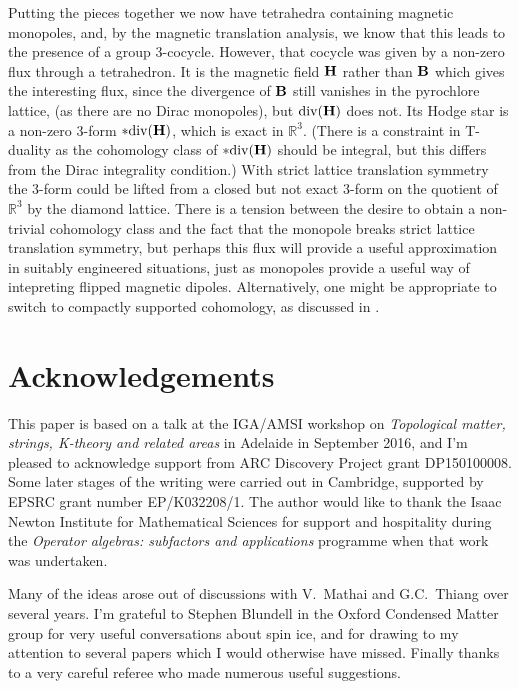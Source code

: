 \documentclass[11pt]{article}
\newcommand{\real}{{\mathbb R}}
\begin{document}
Putting the pieces together we now have tetrahedra containing magnetic monopoles, and, by the magnetic translation analysis, we know that this leads to the presence of a group 3-cocycle.
However, that cocycle was given by a non-zero flux through a tetrahedron.
It is the magnetic field ${\bf H}$ rather than ${\bf B}$ which gives the interesting flux, since the divergence of ${\bf B}$ still vanishes in the pyrochlore lattice, (as there are no Dirac monopoles), but ${\rm div}({\bf H})$  does not. Its Hodge star is a non-zero 3-form $*{\rm div}({\bf H})$, which  is exact in $\real^3$.
(There is a constraint in T-duality as the cohomology class of $*{\rm div}({\bf H})$ should be integral, but this differs from the Dirac integrality condition.)
With strict lattice translation symmetry the 3-form could be lifted from a closed but not exact 3-form on the quotient of $\real^3$ by the diamond lattice.
There is a tension between the desire to obtain a non-trivial cohomology class and the fact that the monopole breaks strict lattice translation symmetry, but perhaps this flux will provide a useful approximation in suitably engineered situations, just as monopoles provide a useful way of intepreting flipped magnetic dipoles. 
Alternatively, one might be appropriate to switch to compactly  supported cohomology, as discussed in  \cite[\S 2]{MW}. 





\section*{Acknowledgements}

This paper is based on a talk at the IGA/AMSI workshop on {\it Topological matter, strings, K-theory and related areas} in Adelaide in September 2016, and I'm pleased to acknowledge support from ARC Discovery Project grant DP150100008. 
Some later stages of the writing were carried out  in Cambridge, supported by EPSRC grant number EP/K032208/1. The author would like to thank the Isaac Newton Institute for Mathematical Sciences for support and hospitality during the {\it Operator algebras: subfactors and applications} programme when that work was undertaken.

Many of the ideas arose out of discussions with V.\  Mathai and G.C.\ Thiang over several years.
I'm grateful to Stephen Blundell in the Oxford Condensed Matter group for very useful conversations about spin ice, and for drawing to my attention to several  papers which I would otherwise have missed.
Finally thanks to a very careful referee who made numerous useful suggestions.
\end{document}
